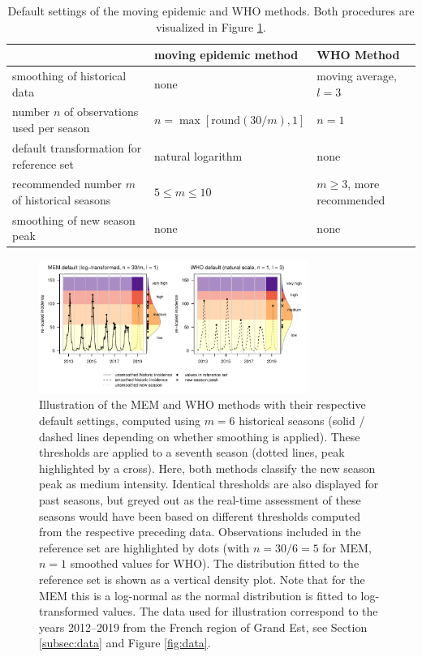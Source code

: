 \documentclass[12pt]{article}
\begin{document}
\begin{table}[h]
\caption{Default settings of the moving epidemic and WHO methods. Both procedures are visualized in Figure \ref{fig:illustration}.}
\label{tab:differences}
\begin{center}
\footnotesize
\begin{tabular}{lll}
\toprule
& moving epidemic method & WHO Method \\
\midrule
smoothing of historical data & none & moving average, $l = 3$\\
number $n$ of observations used per season & $n = \max[\text{round}(30/m), 1]$ & $n = 1$\\
default transformation for reference set & natural logarithm & none\\
recommended number $m$ of historical seasons & $5 \leq m \leq 10$ & $m \geq 3$, more recommended\\
smoothing of new season peak & none & none\\
\bottomrule
\end{tabular}
\end{center}

\end{table}


\begin{figure}
\begin{center}
\includegraphics[width = 0.78\textwidth]{figure/illustration_mem_who.pdf}
\end{center}
\caption{Illustration of the MEM and WHO methods with their respective default settings, computed using $m = 6$ historical seasons (solid / dashed lines depending on whether smoothing is applied). These thresholds are applied to a seventh season (dotted lines, peak highlighted by a cross). Here, both methods classify the new season peak as medium intensity. Identical thresholds are also displayed for past seasons, but greyed out as the real-time assessment of these seasons would have been based on different thresholds computed from the respective preceding data. Observations included in the reference set are highlighted by dots (with $n = 30/6 = 5$ for MEM, $n = 1$ smoothed values for WHO). The distribution fitted to the reference set is shown as a vertical density plot. Note that for the MEM this is a log-normal as the normal distribution is fitted to log-transformed values. The data used for illustration correspond to the years 2012--2019 from the French region of Grand Est, see Section \ref{subsec:data} and Figure \ref{fig:data}.}
\label{fig:illustration}
\end{figure}
\end{document}
